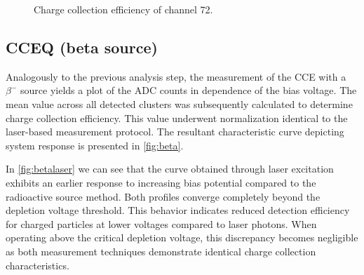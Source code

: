 \begin{figure}[H]
	\centering
	\caption{Charge collection efficiency of channel 72.}
	\label{fig:cce72}
\end{figure}

\subsection{CCEQ (beta source)}

Analogously to the previous analysis step, the measurement of the CCE with a $\beta^{-}$ source yields a plot of the ADC counts in dependence of the bias voltage. The mean value across all detected clusters was subsequently calculated to determine charge collection efficiency. This value underwent normalization identical to the laser-based measurement protocol. The resultant characteristic curve depicting system response is presented in \autoref{fig:beta}.

In \autoref{fig:betalaser} we can see that the curve obtained through laser excitation exhibits an earlier response to increasing bias potential compared to the radioactive source method. Both profiles converge completely beyond the depletion voltage threshold. This behavior indicates reduced detection efficiency for charged particles at lower voltages compared to laser photons. When operating above the critical depletion voltage, this discrepancy becomes negligible as both measurement techniques demonstrate identical charge collection characteristics.

